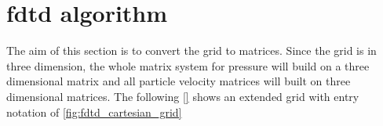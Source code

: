 \section{\gls{fdtd} algorithm}
The aim of this section is to convert the grid to matrices. Since the grid is in three dimension, the whole matrix system for pressure will build on a three dimensional matrix and all particle velocity matrices will built on three dimensional matrices. The following \autoref{} shows an extended grid with entry notation of \autoref{fig:fdtd_cartesian_grid}








